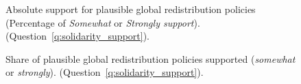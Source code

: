 \begin{figure}[h!]
    \caption[Absolute support for plausible global redistribution policies]{Absolute support for plausible global redistribution policies (Percentage of \textit{Somewhat} or \textit{Strongly support}). (Question~\ref{q:solidarity_support}).
    }\label{fig:solidarity_support_positive}
\end{figure}

\begin{figure}[h!]
    \caption[Share of plausible global policies supported]{Share of plausible global redistribution policies supported (\textit{somewhat} or \textit{strongly}). (Question~\ref{q:solidarity_support}).
    }\label{fig:share_solidarity_supported}
\end{figure}

